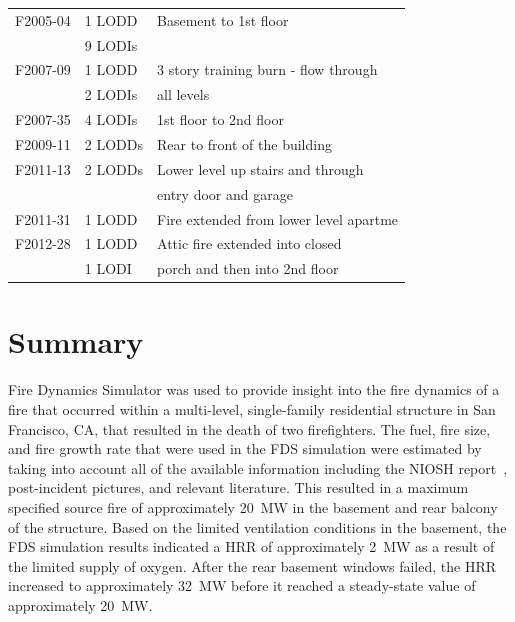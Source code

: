 \documentclass[12pt,oneside]{book}
\begin{document}
\begin{table}[!ht]
\begin{tabular}{lll}
F2005-04 \cite{NIOSH:McFall4}       &  1 LODD             &  Basement to 1st floor                   \\
                                    &  9 LODIs            &                                          \\
F2007-09 \cite{NIOSH:Tarley}        &  1 LODD             &  3 story training burn - flow through    \\
                                    &  2 LODIs            &  all levels                              \\
F2007-35 \cite{NIOSH:Braddee}       &  4 LODIs            &  1st floor to 2nd floor                  \\
F2009-11 \cite{NIOSH:Merinar}       &  2 LODDs            &  Rear to front of the building           \\
F2011-13 \cite{NIOSH:Bowyer2}       &  2 LODDs            &  Lower level up stairs and through       \\
                                    &                     &  entry door and garage                   \\
F2011-31 \cite{NIOSH:Loflin}        &  1 LODD             &  Fire extended from lower level apartme  \\
F2012-28 \cite{NIOSH:Bowyer}        &  1 LODD             &  Attic fire extended into closed         \\
                                    &  1 LODI             &  porch and then into 2nd floor           \\
\bottomrule
\end{tabular}
\label{tab:LODD}
\end{table}


\chapter{Summary}
\label{sec:summary}

Fire Dynamics Simulator was used to provide insight into the fire dynamics of a fire that occurred within a multi-level, single-family residential structure in San Francisco, CA, that resulted in the death of two firefighters. The fuel, fire size, and fire growth rate that were used in the FDS simulation were estimated by taking into account all of the available information including the NIOSH report~\cite{NIOSH:Bowyer2}, post-incident pictures, and relevant literature. This resulted in a maximum specified source fire of approximately 20~MW in the basement and rear balcony of the structure. Based on the limited ventilation conditions in the basement, the FDS simulation results indicated a HRR of approximately 2~MW as a result of the limited supply of oxygen. After the rear basement windows failed, the HRR increased to approximately 32~MW before it reached a steady-state value of approximately 20~MW.
\end{document}
